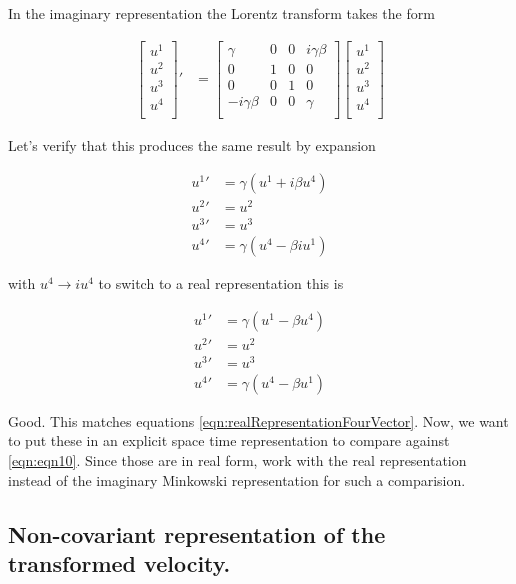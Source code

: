 \documentclass{article}
\begin{document}
In the imaginary representation the Lorentz transform takes the form

\begin{align*}
{\begin{bmatrix}
u^1 \\
u^2 \\
u^3 \\
u^4 \\
\end{bmatrix}}'
&=
\begin{bmatrix}
\gamma & 0 & 0 & i \gamma \beta \\
0 & 1 & 0 & 0 \\
0 & 0 & 1 & 0 \\
- i \gamma \beta & 0 & 0 & \gamma \\
\end{bmatrix}
{\begin{bmatrix}
u^1 \\
u^2 \\
u^3 \\
u^4 \\
\end{bmatrix}} 
\end{align*}

Let's verify that this produces the same result by expansion

\begin{align*}
{u^1}' &= \gamma ( u^1 + i \beta u^4) \\
{u^2}' &= {u^2} \\
{u^3}' &= {u^3} \\
{u^4}' &= \gamma ( u^4 - \beta i u^1)
\end{align*}

with $u^4 \rightarrow i u^4$ to switch to a real representation this is

\begin{align*}
{u^1}' &= \gamma ( u^1 - \beta u^4) \\
{u^2}' &= {u^2} \\
{u^3}' &= {u^3} \\
{u^4}' &= \gamma ( u^4 - \beta u^1)
\end{align*}

Good.  This matches equations \ref{eqn:realRepresentationFourVector}.  Now, we want to put these in an explicit space time representation
to compare against \ref{eqn:eqn10}.  Since those are in real form, work with the real representation instead of the imaginary Minkowski
representation for such a comparision.

\subsection{ Non-covariant representation of the transformed velocity. }
\end{document}
